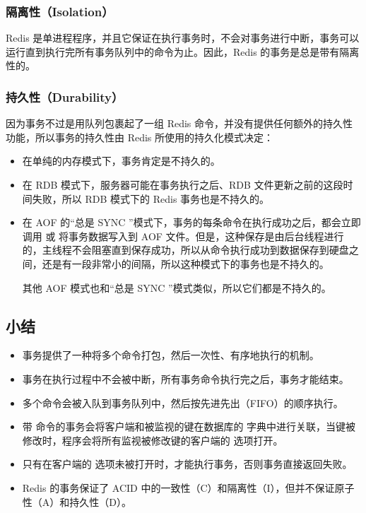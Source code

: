 \documentclass[a4paper,11pt,english]{sphinxmanual}
\begin{document}
\subsubsection{隔离性（Isolation）}
\label{feature/transaction:isolation}
Redis 是单进程程序，并且它保证在执行事务时，不会对事务进行中断，事务可以运行直到执行完所有事务队列中的命令为止。因此，Redis 的事务是总是带有隔离性的。


\subsubsection{持久性（Durability）}
\label{feature/transaction:durability}
因为事务不过是用队列包裹起了一组 Redis 命令，并没有提供任何额外的持久性功能，所以事务的持久性由 Redis 所使用的持久化模式决定：
\begin{itemize}
\item {} 
在单纯的内存模式下，事务肯定是不持久的。

\item {} 
在 RDB 模式下，服务器可能在事务执行之后、RDB 文件更新之前的这段时间失败，所以 RDB 模式下的 Redis 事务也是不持久的。

\item {} 
在 AOF 的“总是 SYNC ”模式下，事务的每条命令在执行成功之后，都会立即调用  或  将事务数据写入到 AOF 文件。但是，这种保存是由后台线程进行的，主线程不会阻塞直到保存成功，所以从命令执行成功到数据保存到硬盘之间，还是有一段非常小的间隔，所以这种模式下的事务也是不持久的。

其他 AOF 模式也和“总是 SYNC ”模式类似，所以它们都是不持久的。

\end{itemize}


\subsection{小结}
\label{feature/transaction:id12}\begin{itemize}
\item {} 
事务提供了一种将多个命令打包，然后一次性、有序地执行的机制。

\item {} 
事务在执行过程中不会被中断，所有事务命令执行完之后，事务才能结束。

\item {} 
多个命令会被入队到事务队列中，然后按先进先出（FIFO）的顺序执行。

\item {} 
带  命令的事务会将客户端和被监视的键在数据库的  字典中进行关联，当键被修改时，程序会将所有监视被修改键的客户端的  选项打开。

\item {} 
只有在客户端的  选项未被打开时，才能执行事务，否则事务直接返回失败。

\item {} 
Redis 的事务保证了 ACID 中的一致性（C）和隔离性（I），但并不保证原子性（A）和持久性（D）。

\end{itemize}
\end{document}
